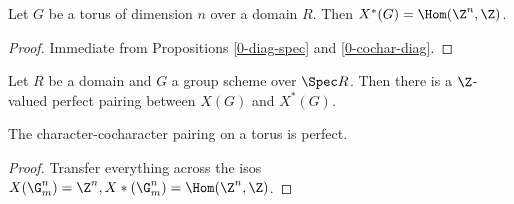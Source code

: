 \begin{proposition}
  \label{0-cochar-torus}
  \leanok

  Let $G$ be a torus of dimension $n$ over a domain $R$.
  Then $X^*(G) = \Hom(\Z^n, \Z)$.
\end{proposition}
\begin{proof}
  \leanok

  Immediate from Propositions \ref{0-diag-spec} and \ref{0-cochar-diag}.
\end{proof}


\begin{definition}
  \label{0-char-cochar-pairing}
  \leanok

  Let $R$ be a domain and $G$ a group scheme over $\Spec R$.
  Then there is a $\Z$-valued perfect pairing between $X(G)$ and $X^*(G)$.
\end{definition}


\begin{proposition}
  \label{0-char-cochar-pairing-perfect}
  \leanok

  The character-cocharacter pairing on a torus is perfect.
\end{proposition}
\begin{proof}
  \leanok

  Transfer everything across the isos $X(\G_m^n) = \Z^n, X*(\G_m^n) = \Hom(\Z^n, \Z)$.
\end{proof}


